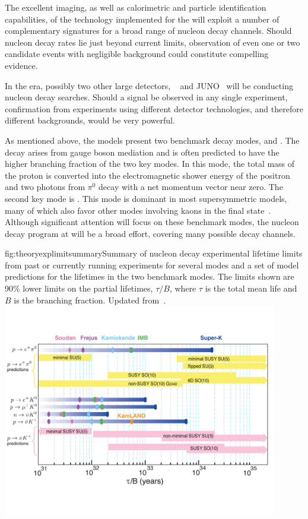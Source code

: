 The excellent imaging, as well as calorimetric and particle identification capabilities, of the  technology  implemented for the   will exploit a number of complementary signatures for a broad range of nucleon decay channels.  Should nucleon decay rates lie just beyond current limits, observation of even one or two candidate events with negligible background could constitute compelling evidence.

In the  era, possibly two other large detectors, \hyperk~\cite{Abe:2018uyc} and JUNO~\cite{Djurcic:2015vqa} will be conducting nucleon decay searches. Should a signal be observed in any single experiment, confirmation from experiments using different detector technologies, and therefore different backgrounds, would be very powerful.

As mentioned above, the  models present two benchmark decay modes, \ptoepizero and \ptoknubar.  The decay \ptoepizero arises from gauge boson mediation and is often predicted to have the higher branching fraction of the two key modes. In this mode, the total mass of the proton is converted into the electromagnetic shower energy of the positron and two photons from $\pi^0$ decay with a net momentum vector near zero. 
The second key mode is \ptoknubar. This mode is dominant in most supersymmetric  models,
many of which also favor other modes involving kaons in the final state~\cite{Dimopoulos:1981dw}.
Although significant attention will focus on these benchmark modes, the nucleon decay program at  will be a broad effort, covering many possible decay channels.

\begin{dunefigure}{fig:theoryexplimitsummary}{Summary of nucleon decay experimental lifetime limits from past or currently running experiments for several modes and a set of  model predictions for the lifetimes in the two benchmark modes.  The limits shown are 90\%  lower limits on the partial lifetimes, $\tau/B$, where $\tau$ is the total mean life and $B$ is the branching fraction. Updated from~\cite{Babu:2013jba}.}
\includegraphics[width=0.9\textwidth]{graphics/TheoryExpLimitSummary.pdf}
\end{dunefigure}


